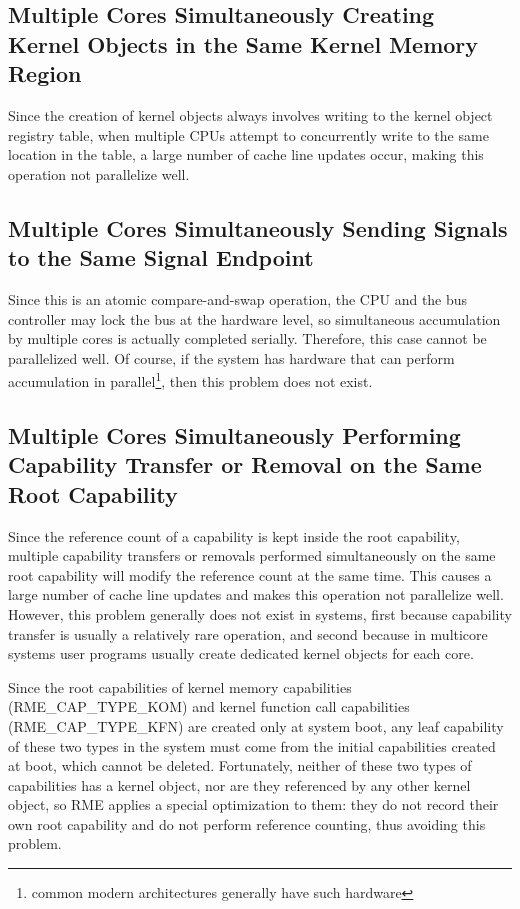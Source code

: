 \subsection{Multiple Cores Simultaneously Creating Kernel Objects in the Same Kernel Memory Region}\label{subsec:9-concurrent-kernel-object-creation}

Since the creation of kernel objects always involves writing to the kernel object registry table, when multiple CPUs attempt to concurrently write to the same location in the table, a large number of cache line updates occur, making this operation not parallelize well.

\subsection{Multiple Cores Simultaneously Sending Signals to the Same Signal Endpoint}\label{subsec:9-concurrent-signal-sending}

Since this is an atomic compare-and-swap operation, the CPU and the bus controller may lock the bus at the hardware level, so simultaneous accumulation by multiple cores is actually completed serially. Therefore, this case cannot be parallelized well. Of course, if the system has hardware that can perform accumulation in parallel\footnote{common modern architectures generally have such hardware}, then this problem does not exist.

\subsection{Multiple Cores Simultaneously Performing Capability Transfer or Removal on the Same Root Capability}\label{subsec:9-concurrent-root-capability-transfer}

Since the reference count of a capability is kept inside the root capability, multiple capability transfers or removals performed simultaneously on the same root capability will modify the reference count at the same time. This causes a large number of cache line updates and makes this operation not parallelize well. However, this problem generally does not exist in systems, first because capability transfer is usually a relatively rare operation, and second because in multicore systems user programs usually create dedicated kernel objects for each core.

Since the root capabilities of kernel memory capabilities (RME\_CAP\_TYPE\_KOM) and kernel function call capabilities (RME\_CAP\_TYPE\_KFN) are created only at system boot, any leaf capability of these two types in the system must come from the initial capabilities created at boot, which cannot be deleted. Fortunately, neither of these two types of capabilities has a kernel object, nor are they referenced by any other kernel object, so RME applies a special optimization to them: they do not record their own root capability and do not perform reference counting, thus avoiding this problem.

